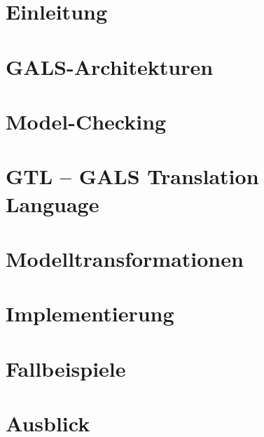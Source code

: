 \documentclass[
  10pt,
  a4paper,
  twoside,
  titlepage,
  headings=normal,
  bibliography=totoc,
  openright,
  abstracton]{scrreprt}
\begin{document}
\chapter{Einleitung}

\chapter{GALS-Architekturen}

\chapter{Model-Checking}


\chapter{GTL -- GALS Translation Language}

\chapter{Modelltransformationen}




\chapter{Implementierung}








\chapter{Fallbeispiele}

\chapter{Ausblick}


\begin{appendix}
  
  
\end{appendix}
\end{document}
